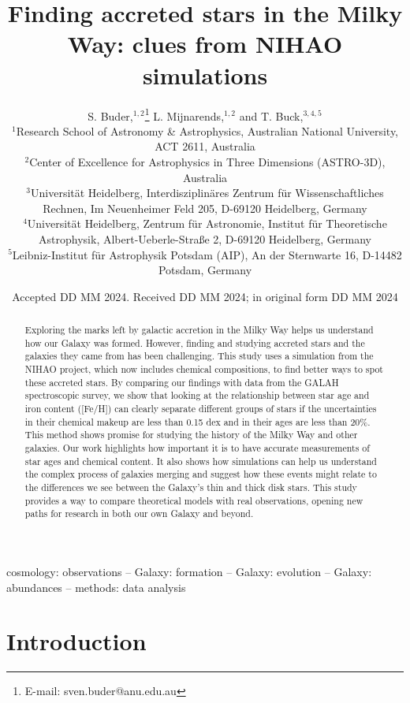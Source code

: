 \documentclass[fleqn,usenatbib]{mnras}
\title[Accreted stars in NIHAO and GALAH]{Finding accreted stars in the Milky Way: clues from NIHAO simulations}
\author[Buder, Mijnarends, and Buck]{
S. Buder,$^{1,2}$\thanks{E-mail: sven.buder@anu.edu.au}
L. Mijnarends,$^{1,2}$ and
T. Buck,$^{3,4,5}$
\\
$^{1}$Research School of Astronomy \& Astrophysics, Australian National University, ACT 2611, Australia\\
$^{2}$Center of Excellence for Astrophysics in Three Dimensions (ASTRO-3D), Australia\\
$^{3}$Universit{\"a}t Heidelberg, Interdisziplin{\"a}res Zentrum f{\"u}r Wissenschaftliches Rechnen, Im Neuenheimer Feld 205, D-69120 Heidelberg, Germany\\
$^{4}$Universit{\"a}t Heidelberg, Zentrum f{\"u}r Astronomie, Institut f{\"u}r Theoretische Astrophysik, Albert-Ueberle-Straße 2, D-69120 Heidelberg, Germany\\
$^{5}$Leibniz-Institut f{\"u}r Astrophysik Potsdam (AIP), An der Sternwarte 16, D-14482 Potsdam, Germany
}
\date{Accepted DD MM 2024. Received DD MM 2024; in original form DD MM 2024}
\begin{document}
\label{firstpage}
\pagerange{\pageref{firstpage}--\pageref{lastpage}}
\maketitle

\begin{abstract} %
Exploring the marks left by galactic accretion in the Milky Way helps us understand how our Galaxy was formed. However, finding and studying accreted stars and the galaxies they came from has been challenging. This study uses a simulation from the NIHAO project, which now includes chemical compositions, to find better ways to spot these accreted stars. By comparing our findings with data from the GALAH spectroscopic survey, we show that looking at the relationship between star age and iron content ([Fe/H]) can clearly separate different groups of stars if the uncertainties in their chemical makeup are less than 0.15 dex and in their ages are less than 20\%. This method shows promise for studying the history of the Milky Way and other galaxies. Our work highlights how important it is to have accurate measurements of star ages and chemical content. It also shows how simulations can help us understand the complex process of galaxies merging and suggest how these events might relate to the differences we see between the Galaxy's thin and thick disk stars. This study provides a way to compare theoretical models with real observations, opening new paths for research in both our own Galaxy and beyond.
\end{abstract}
\begin{keywords}
cosmology: observations -- Galaxy: formation -- Galaxy: evolution -- Galaxy: abundances -- methods: data analysis
\end{keywords}



\section{Introduction}
\label{sec:intro}
\end{document}
